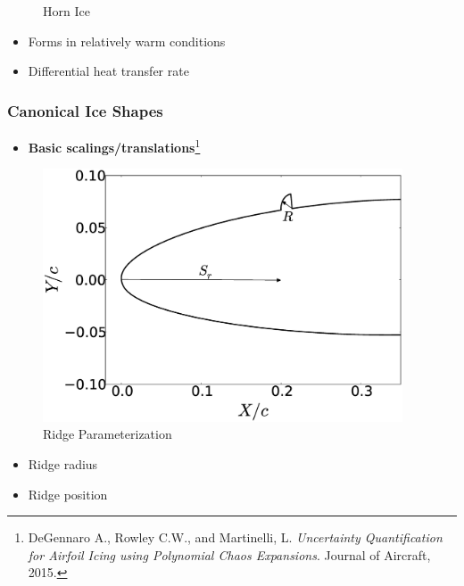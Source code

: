 \documentclass[9pt]{beamer}
\begin{document}
\begin{frame}
\begin{minipage}[t]{0.4\linewidth}
\begin{figure}[t]
\caption{Horn Ice}
\end{figure}
\vspace{-0.5cm}
\begin{itemize}
\item Forms in relatively warm conditions
\item Differential heat transfer rate
\end{itemize}
\end{minipage}
\end{frame}
\begin{frame}
\frametitle{Canonical Ice Shapes}
\label{sec-2-2}

\begin{itemize}
\item \textbf{Basic scalings/translations}\footnote{DeGennaro A., Rowley C.W., and Martinelli,
L. \emph{Uncertainty Quantification for Airfoil Icing using Polynomial Chaos Expansions}. Journal of Aircraft, 2015.
 }
\end{itemize}
\centering
\vspace{-0.5cm}
\begin{minipage}[t]{0.45\linewidth}
\begin{figure}[t]
\includegraphics[width=0.95\textwidth]{RidgeParameters}
\caption{Ridge Parameterization}
\end{figure}
\vspace{-0.5cm}
\begin{itemize}
\item Ridge radius
\item Ridge position
\end{itemize}
\end{minipage}
\begin{minipage}[t]{0.45\linewidth}

\end{minipage}
\end{frame}
\end{document}
